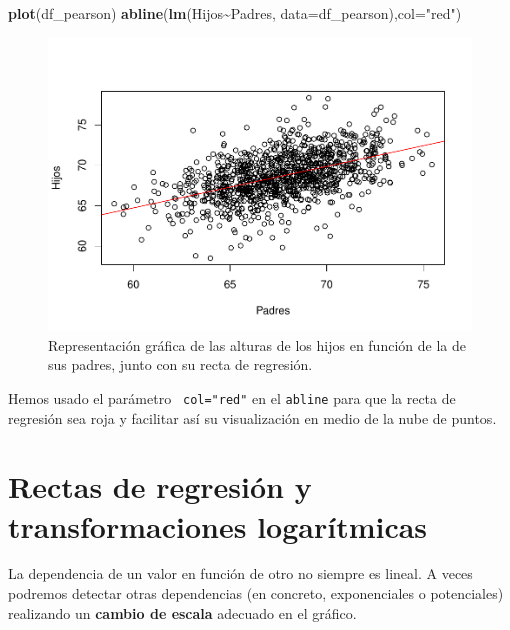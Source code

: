 \documentclass[
]{book}
\newenvironment{Shaded}{\begin{snugshade}}{\end{snugshade}}
\newcommand{\DataTypeTok}[1]{\textcolor[rgb]{0.13,0.29,0.53}{#1}}
\newcommand{\KeywordTok}[1]{\textcolor[rgb]{0.13,0.29,0.53}{\textbf{#1}}}
\newcommand{\NormalTok}[1]{#1}
\newcommand{\OperatorTok}[1]{\textcolor[rgb]{0.81,0.36,0.00}{\textbf{#1}}}
\newcommand{\StringTok}[1]{\textcolor[rgb]{0.31,0.60,0.02}{#1}}
\theoremstyle{definition}
\theoremstyle{definition}
\theoremstyle{definition}
\theoremstyle{remark}
\begin{document}
\begin{Shaded}
\begin{Highlighting}[]
\KeywordTok{plot}\NormalTok{(df\_pearson)}
\KeywordTok{abline}\NormalTok{(}\KeywordTok{lm}\NormalTok{(Hijos}\OperatorTok{\textasciitilde{}}\NormalTok{Padres, }\DataTypeTok{data=}\NormalTok{df\_pearson),}\DataTypeTok{col=}\StringTok{"red"}\NormalTok{)}
\end{Highlighting}
\end{Shaded}

\begin{figure}

{\centering \includegraphics[width=0.9\linewidth]{03chap02_Un_aperitivo_files/figure-latex/pears2-1} 

}

\caption{Representación gráfica de las alturas de los hijos en función de la de sus padres, junto con su recta de regresión.}\label{fig:pears2}
\end{figure}

Hemos usado el parámetro \verb+ col="red"+ en el \texttt{abline} para que la recta de regresión sea roja y facilitar así su visualización en medio de la nube de puntos.

\hypertarget{rectas-de-regresiuxf3n-y-transformaciones-logaruxedtmicas}{
\section{Rectas de regresión y transformaciones logarítmicas}\label{rectas-de-regresiuxf3n-y-transformaciones-logaruxedtmicas}}

La dependencia de un valor en función de otro no siempre es lineal. A veces podremos detectar otras dependencias (en concreto, exponenciales o potenciales) realizando un \textbf{cambio de escala} adecuado en el gráfico.
\end{document}
